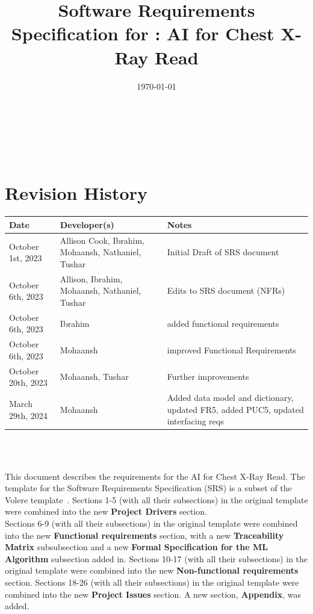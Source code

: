 \documentclass[12pt]{article}
\begin{document}
\title{Software Requirements Specification for \progname: AI for Chest X-Ray Read}
\author{\authname}
\date{\today}
  
\maketitle

~\newpage


\tableofcontents

~\newpage

\section*{Revision History}

\begin{tabularx}{\textwidth}{p{4cm}p{4cm}X}
\toprule {\textbf{Date}} & {\textbf{Developer(s)}} & {\textbf{Notes}}\\
\midrule
October 1st, 2023 & Allison Cook, Ibrahim, Mohaansh, Nathaniel,
Tushar & Initial Draft of SRS document \\
October 6th, 2023 & Allison, Ibrahim, Mohaansh, Nathaniel, Tushar & Edits to SRS document (NFRs) \\
October 6th, 2023 & Ibrahim & added functional requirements \\
October 6th, 2023 & Mohaansh & improved Functional Requirements \\
October 20th, 2023 & Mohaansh, Tushar & Further improvements \\
March 29th, 2024 & Mohaansh & Added data model and dictionary, updated FR5, added PUC5, updated interfacing reqs \\

\bottomrule
\end{tabularx}

~\\

~\newpage


\noindent This document describes the requirements for the AI for Chest X-Ray Read. The template for the
Software Requirements Specification (SRS) is a subset of the Volere
template~\citep{RobertsonAndRobertson2012}.
Sections 1-5 (with all their subsections) in the original template were combined into the new \textbf{Project Drivers} section. \\

\noindent Sections 6-9 (with all their subsections) in the original template were combined into the new \textbf{Functional requirements} section, with a new \textbf{Traceability Matrix} subsubsection and a new \textbf{Formal Specification for the ML Algorithm} subsection added in.
Sections 10-17 (with all their subsections) in the original template were combined into the new \textbf{Non-functional requirements} section. Sections 18-26 (with all their subsections) in the original template were combined into the new \textbf{Project Issues} section. A new section, \textbf{Appendix}, was added.
\end{document}
